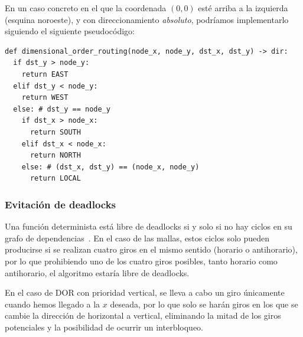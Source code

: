 En un caso concreto en el que la coordenada $(0,0)$ esté arriba a la izquierda (esquina noroeste), y con direccionamiento \textit{absoluto}, podríamos implementarlo siguiendo el siguiente pseudocódigo:

\begin{verbatim}
def dimensional_order_routing(node_x, node_y, dst_x, dst_y) -> dir:
  if dst_y > node_y:
    return EAST
  elif dst_y < node_y:
    return WEST
  else: # dst_y == node_y
    if dst_x > node_x:
      return SOUTH
    elif dst_x < node_x:
      return NORTH
    else: # (dst_x, dst_y) == (node_x, node_y)
      return LOCAL
\end{verbatim}

\subsubsection{Evitación de deadlocks}

Una función determinista está libre de deadlocks si y solo si no hay ciclos en su grafo de dependencias~\cite{Duato03}. En el caso de las mallas, estos ciclos solo pueden producirse si se realizan cuatro giros en el mismo sentido (horario o antihorario), por lo que prohibiendo uno de los cuatro giros posibles, tanto horario como antihorario, el algoritmo estaría libre de deadlocks.

En el caso de DOR con prioridad vertical, se lleva a cabo un giro únicamente cuando hemos llegado a la $x$ deseada, por lo que solo se harán giros en los que se cambie la dirección de horizontal a vertical, eliminando la mitad de los giros potenciales y la posibilidad de ocurrir un interbloqueo.
